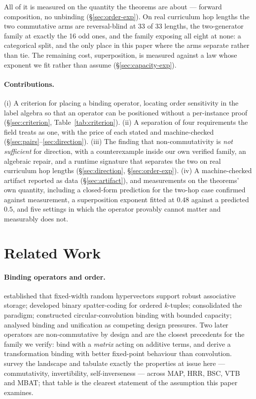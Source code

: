 \documentclass[10pt]{article}
\begin{document}
All of it is measured on the quantity the theorems are about --- forward composition, no unbinding (\S\ref{sec:order-exp}). On real curriculum hop lengths the two commutative arms are reversal-blind at 33 of 33 lengths, the two-generator family at exactly the 16 odd ones, and the family exposing all eight at none: a categorical split, and the only place in this paper where the arms separate rather than tie. The remaining cost, superposition, is measured against a law whose exponent we fit rather than assume (\S\ref{sec:capacity-exp}).

\paragraph{Contributions.} (i) A criterion for placing a binding operator, locating order sensitivity in the label algebra so that an operator can be positioned without a per-instance proof (\S\ref{sec:criterion}, Table~\ref{tab:criterion}). (ii) A separation of four requirements the field treats as one, with the price of each stated and machine-checked (\S\ref{sec:pairs}--\ref{sec:direction}). (iii) The finding that non-commutativity is \emph{not sufficient} for direction, with a counterexample inside our own verified family, an algebraic repair, and a runtime signature that separates the two on real curriculum hop lengths (\S\ref{sec:direction}, \S\ref{sec:order-exp}). (iv) A machine-checked artifact reported as data (\S\ref{sec:artifact}), and measurements on the theorems' own quantity, including a closed-form prediction for the two-hop case confirmed against measurement, a superposition exponent fitted at $0.48$ against a predicted $0.5$, and five settings in which the operator provably cannot matter and measurably does not.


\section{Related Work}
\label{sec:related}

\paragraph{Binding operators and order.} \citet{kanerva1988sparse} established that fixed-width random hypervectors support robust associative storage; \citet{kanerva1996binary} developed binary spatter-coding for ordered $k$-tuples; \citet{kanerva2009hyperdimensional} consolidated the paradigm; \citet{plate1995holographic,plate2003holographic} constructed circular-convolution binding with bounded capacity; \citet{gayler1998connections} analysed binding and unification as competing design pressures. Two later operators are non-commutative by design and are the closest precedents for the family we verify: \citet{gallant2013mbat} bind with a \emph{matrix} acting on additive terms, and \citet{gosmann2019vtb} derive a transformation binding with better fixed-point behaviour than convolution. \citet{schlegel2022comparison} survey the landscape and tabulate exactly the properties at issue here --- commutativity, invertibility, self-inverseness --- across MAP, HRR, BSC, VTB and MBAT; that table is the clearest statement of the assumption this paper examines.
\end{document}
